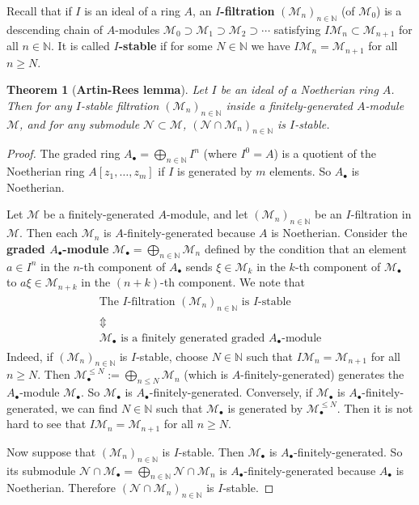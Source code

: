 \documentclass[12pt,b5paper,notitlepage]{report}
\theoremstyle{definition}
\theoremstyle{plain}
\newtheorem{thm}[df]{Theorem}
\newcommand{\mc}{\mathcal}
\newcommand{\blt}{\bullet}
\newcommand{\Nbb}{\mathbb N}
\numberwithin{equation}{section}
\begin{document}
Recall that if $I$ is an ideal of a ring $A$, an \textbf{$I$-filtration} $(\mc M_n)_{n\in\Nbb}$ (of $\mc M_0$) is a descending chain of $A$-modules $\mc M_0\supset\mc M_1\supset\mc M_2\supset\cdots$ satisfying $I\mc M_n\subset\mc M_{n+1}$ for all $n\in\Nbb$. It is called \textbf{$I$-stable} if for some $N\in\Nbb$ we have $I\mc M_n=\mc M_{n+1}$ for all $n\geq N$.

\begin{thm}[\textbf{Artin-Rees lemma}]\label{lb266} 
Let $I$ be an ideal of a Noetherian ring $A$. Then for any $I$-stable filtration $(\mc M_n)_{n\in\Nbb}$ inside a finitely-generated $A$-module $\mc M$, and for any submodule $\mc N\subset\mc M$, $(\mc N\cap\mc M_n)_{n\in\Nbb}$ is $I$-stable.
\end{thm}

\begin{proof}
The graded ring $A_\blt=\bigoplus_{n\in\Nbb}I^n$ (where $I^0=A$) is a quotient of the Noetherian ring $A[z_1,\dots,z_m]$ if $I$ is generated by $m$ elements. So $A_\blt$ is Noetherian. 

Let $\mc M$ be a finitely-generated $A$-module, and let $(\mc M_n)_{n\in\Nbb}$ be an $I$-filtration in $\mc M$. Then each $\mc M_n$ is $A$-finitely-generated because $A$ is Noetherian. Consider the \textbf{graded $A_\blt$-module}  $\mc M_\blt=\bigoplus_{n\in\Nbb}\mc M_n$ defined by the condition that an element  $a\in I^n$ in the $n$-th component of $A_\blt$ sends $\xi\in\mc M_k$ in the $k$-th component of $\mc M_\blt$  to $a\xi\in\mc M_{n+k}$ in the $(n+k)$-th component. We note that
\begin{gather}
\begin{gathered}
\text{The $I$-filtration $(\mc M_n)_{n\in\Nbb}$ is $I$-stable}\\
\Updownarrow\\
\text{$\mc M_\blt$ is a finitely generated graded $A_\blt$-module}
\end{gathered}
\end{gather}
Indeed, if $(\mc M_n)_{n\in\Nbb}$ is $I$-stable, choose $N\in\Nbb$ such that $I\mc M_n=\mc M_{n+1}$ for all $n\geq N$. Then $\mc M_\blt^{\leq N}:=\bigoplus_{n\leq N}\mc M_n$ (which is $A$-finitely-generated) generates the $A_\blt$-module $\mc M_\blt$. So $\mc M_\blt$ is  $A_\blt$-finitely-generated. Conversely, if $\mc M_\blt$ is $A_\blt$-finitely-generated, we can find $N\in\Nbb$ such that $\mc M_\blt$ is generated by $\mc M_\blt^{\leq N}$. Then it is not hard to see that $I\mc M_n=\mc M_{n+1}$ for all $n\geq N$.

Now suppose that $(\mc M_n)_{n\in\Nbb}$ is $I$-stable. Then $\mc M_\blt$ is $A_\blt$-finitely-generated. So its submodule $\mc N\cap\mc M_\blt=\bigoplus_{n\in\Nbb}\mc N\cap\mc M_n$ is $A_\blt$-finitely-generated because $A_\blt$ is Noetherian. Therefore $(\mc N\cap\mc M_n)_{n\in\Nbb}$ is $I$-stable.
\end{proof}
\end{document}
